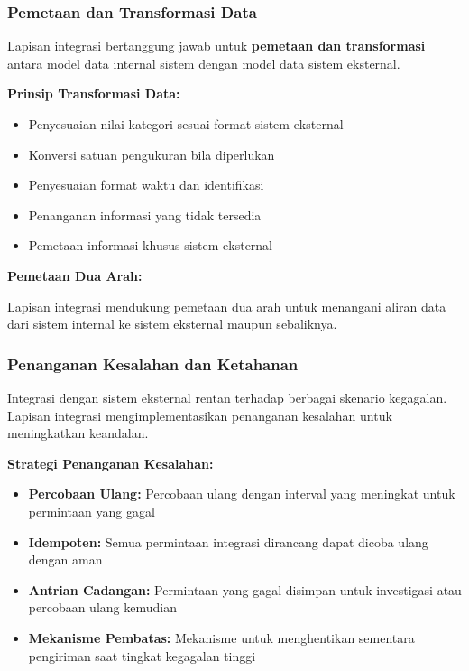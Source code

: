 \subsubsection{Pemetaan dan Transformasi Data}

Lapisan integrasi bertanggung jawab untuk \textbf{pemetaan dan transformasi} antara model data internal sistem dengan model data sistem eksternal.

\textbf{Prinsip Transformasi Data:}

\begin{itemize}
  \item Penyesuaian nilai kategori sesuai format sistem eksternal
  \item Konversi satuan pengukuran bila diperlukan
  \item Penyesuaian format waktu dan identifikasi
  \item Penanganan informasi yang tidak tersedia
  \item Pemetaan informasi khusus sistem eksternal
\end{itemize}

\textbf{Pemetaan Dua Arah:}

Lapisan integrasi mendukung pemetaan dua arah untuk menangani aliran data dari sistem internal ke sistem eksternal maupun sebaliknya.

\subsubsection{Penanganan Kesalahan dan Ketahanan}

Integrasi dengan sistem eksternal rentan terhadap berbagai skenario kegagalan. Lapisan integrasi mengimplementasikan penanganan kesalahan untuk meningkatkan keandalan.

\textbf{Strategi Penanganan Kesalahan:}

\begin{itemize}
  \item \textbf{Percobaan Ulang:} Percobaan ulang dengan interval yang meningkat untuk permintaan yang gagal
  \item \textbf{Idempoten:} Semua permintaan integrasi dirancang dapat dicoba ulang dengan aman
  \item \textbf{Antrian Cadangan:} Permintaan yang gagal disimpan untuk investigasi atau percobaan ulang kemudian
  \item \textbf{Mekanisme Pembatas:} Mekanisme untuk menghentikan sementara pengiriman saat tingkat kegagalan tinggi
\end{itemize}

